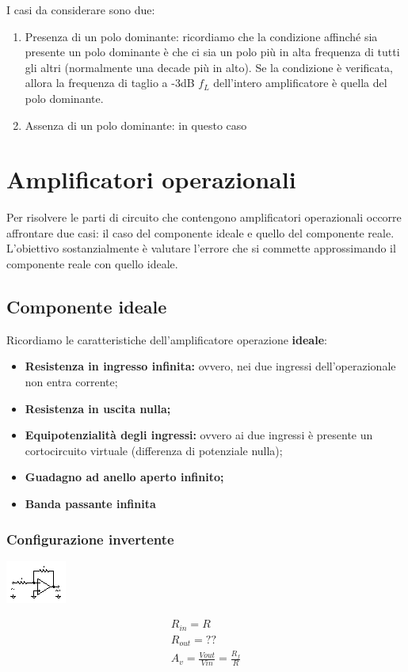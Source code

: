 \documentclass[a4paper,twocolumn,notitlepage]{book}
\begin{document}
	I casi da considerare sono due:
	\begin{enumerate}
		\item Presenza di un polo dominante: ricordiamo che la condizione affinché sia presente un polo dominante è che ci sia un polo più in alta frequenza di tutti gli altri (normalmente una decade più in alto). Se la condizione è verificata, allora la frequenza di taglio a -3dB $f_L$ dell'intero amplificatore è quella del polo dominante.
		
		\item Assenza di un polo dominante: in questo caso
	\end{enumerate}
	
	\section*{Amplificatori operazionali}
	Per risolvere le parti di circuito che contengono amplificatori operazionali occorre affrontare due casi: il caso del componente ideale e quello del componente reale. L'obiettivo sostanzialmente è valutare l'errore che si commette approssimando il componente reale con quello ideale.
	\subsection*{Componente ideale}
	Ricordiamo le caratteristiche dell'amplificatore operazione \textbf{ideale}:
	\begin{itemize}
		\item \textbf{Resistenza in ingresso infinita:} ovvero, nei due ingressi dell'operazionale non entra corrente;
		\item \textbf{Resistenza in uscita nulla;}
		\item \textbf{Equipotenzialità degli ingressi:} ovvero ai due ingressi è presente un cortocircuito virtuale (differenza di potenziale nulla);
		\item \textbf{Guadagno ad anello aperto infinito;}
		\item \textbf{Banda passante infinita}
	\end{itemize}
	\subsubsection*{Configurazione invertente}
		\begin{center}
			\includegraphics[scale=6]{schemi/invertente.eps}
		\end{center}
		\begin{multline}
			R_{in}=R \\
			R_{out}= ?? \\
			A_v=\frac{Vout}{Vin}=\frac{R_f}{R}
		\end{multline}	
	
\end{document}
